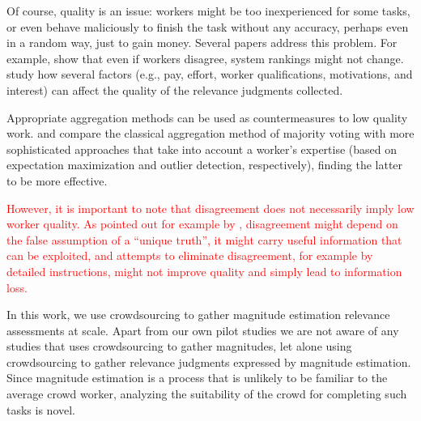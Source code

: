 Of course, quality is an issue: workers might be too inexperienced for
some tasks, or even behave maliciously to finish the task without any
accuracy, perhaps even in a random way, just to gain money. 
Several papers address this problem.
For example, \citet{Clough2013} show that even if workers disagree,
system rankings might not change. 
\citet{Kazai2013} study how several factors (e.g., pay, effort, worker
qualifications, motivations, and interest) can affect the quality of
the relevance judgments collected.

Appropriate aggregation methods can be used as countermeasures to low
quality work. 
\citet{Hosseini:2012} and \citet{Jung2011} compare the classical
aggregation method of majority voting with more sophisticated
approaches that take into account a worker's expertise (based on
expectation maximization and outlier detection, respectively), finding
the latter to be more effective. 

\textcolor{red}{However, it is important to note that disagreement does
not necessarily imply low worker quality.
As pointed out for example by \citet{aroyo2015truth}, disagreement
might depend on the false assumption of a ``unique truth'', it might
carry useful information that can be exploited, and attempts to
eliminate disagreement, for example by detailed instructions, might not
improve quality and simply lead to information loss.} 

In this work, we use crowdsourcing to gather magnitude estimation
relevance assessments at scale.
Apart from our own pilot studies \citep{SchMad14,MadMiz15} we
are not aware of any studies that uses crowdsourcing to gather magnitudes,
let alone using crowdsourcing to gather relevance judgments expressed
by magnitude estimation.
Since magnitude estimation is a process that is unlikely to be familiar
to the average crowd worker, analyzing the suitability of the crowd for
completing such tasks is novel.



